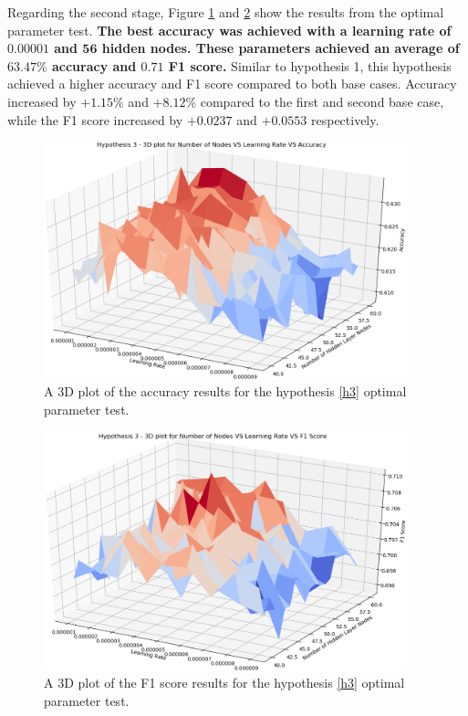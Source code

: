 \documentclass{UoYCSproject}
\begin{document}
Regarding the second stage, Figure \ref{fig:h3_plot_accuracy} and \ref{fig:h3_plot_f1} show the results from the optimal parameter test. \textbf{The best accuracy was achieved with a learning rate of $\boldsymbol{0.00001}$ and $\boldsymbol{56}$ hidden nodes.  These parameters achieved an average of $\boldsymbol{63.47\%}$ accuracy and $\boldsymbol{0.71}$ F1 score.} Similar to hypothesis 1, this hypothesis achieved a higher accuracy and F1 score compared to both base cases. Accuracy increased by $+1.15$\% and $+8.12$\% compared to the first and second base case, while the F1 score increased by $+0.0237$ and $+0.0553$ respectively.

\begin{figure}[h]
\includegraphics[width=10.5cm]{h3_accuracy.png}
\centering
\caption{A 3D plot of the accuracy results for the hypothesis \ref{h3} optimal parameter test.} 
\label{fig:h3_plot_accuracy}
\end{figure}

\begin{figure}[h]
\includegraphics[width=10.5cm]{h3_f1.png}
\centering
\caption{A 3D plot of the F1 score results for the hypothesis \ref{h3} optimal parameter test.} 
\label{fig:h3_plot_f1}
\end{figure}
\end{document}
